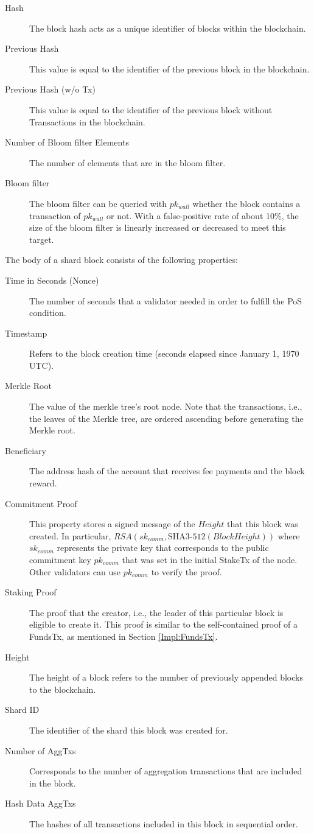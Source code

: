 \begin{description}
  \item[Hash] The block hash acts as a unique identifier of blocks within the blockchain.
  \item[Previous Hash] This value is equal to the identifier of the previous block in the blockchain.
  \item[Previous Hash (w/o Tx)] This value is equal to the identifier of the previous block without Transactions in the blockchain.
  \item[Number of Bloom filter Elements] The number of elements that are in the bloom filter.
  \item[Bloom filter] The bloom filter can be queried with $pk_{wall}$ whether the block contains a transaction of $pk_{wall}$ or not. With a false-positive rate of about 10\%, the size of the bloom filter is linearly increased or decreased to meet this target.
\end{description}

\noindent The body of a shard block consists of the following properties:

\begin{description}
  \item[Time in Seconds (Nonce)] The number of seconds that a validator needed in order to fulfill the PoS condition.
  \item[Timestamp] Refers to the block creation time (seconds elapsed since January 1, 1970 UTC).
  \item[Merkle Root] The value of the merkle tree's root node. Note that the transactions, i.e., the leaves of the Merkle tree, are ordered ascending before generating the Merkle root.
  \item[Beneficiary] The address hash of the account that receives fee payments and the block reward.
  \item[Commitment Proof] This property stores a signed message of the $Height$ that this block was created. In particular, $RSA(sk_{comm}, \text{SHA3-512}(BlockHeight))$ where $sk_{comm}$ represents the private key that corresponds to the public commitment key $pk_{comm}$ that was set in the initial StakeTx of the node. Other validators can use $pk_{comm}$ to verify the proof.
  \item[Staking Proof] The proof that the creator, i.e., the leader of this particular block is eligible to create it. This proof is similar to the self-contained proof of a FundsTx, as mentioned in Section \ref{Impl:FundsTx}.
  \item[Height] The height of a block refers to the number of previously appended blocks to the blockchain.
  \item[Shard ID] The identifier of the shard this block was created for.
  \item[Number of AggTxs] Corresponds to the number of aggregation transactions that are included in the block.
  \item[Hash Data AggTxs] The hashes of all transactions included in this block in sequential order.
\end{description}
